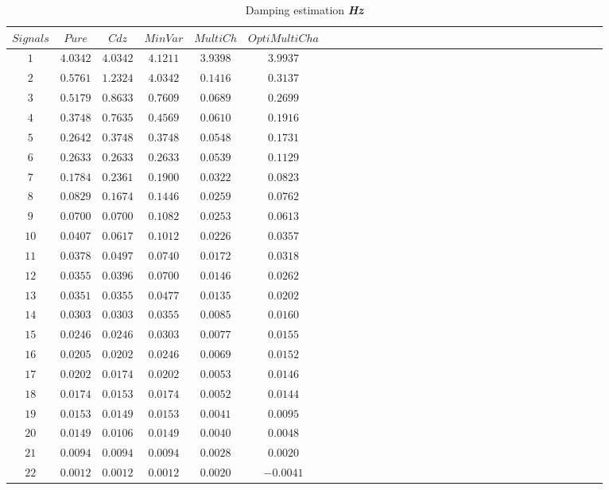  \begin{table}[!htbp]
\centering
\caption{Damping estimation \textbf{\textit{Hz}}}
\label{table:5}
\begin{tabular}{c c c c c c c c c c c c c c c c c c c c c c c c c c c c c c c } 
   \hline 
$Signals$&$Pure$&$Cdz$&$MinVar$&$MultiCh$&$OptiMultiCha$\\
   \hline 
$1$&$ 4.0342$&$ 4.0342$&$ 4.1211$&$ 3.9398$&$ 3.9937$\\
$2$&$ 0.5761$&$ 1.2324$&$ 4.0342$&$ 0.1416$&$ 0.3137$\\
$3$&$ 0.5179$&$ 0.8633$&$ 0.7609$&$ 0.0689$&$ 0.2699$\\
$4$&$ 0.3748$&$ 0.7635$&$ 0.4569$&$ 0.0610$&$ 0.1916$\\
$5$&$ 0.2642$&$ 0.3748$&$ 0.3748$&$ 0.0548$&$ 0.1731$\\
$6$&$ 0.2633$&$ 0.2633$&$ 0.2633$&$ 0.0539$&$ 0.1129$\\
$7$&$ 0.1784$&$ 0.2361$&$ 0.1900$&$ 0.0322$&$ 0.0823$\\
$8$&$ 0.0829$&$ 0.1674$&$ 0.1446$&$ 0.0259$&$ 0.0762$\\
$9$&$ 0.0700$&$ 0.0700$&$ 0.1082$&$ 0.0253$&$ 0.0613$\\
$10$&$ 0.0407$&$ 0.0617$&$ 0.1012$&$ 0.0226$&$ 0.0357$\\
$11$&$ 0.0378$&$ 0.0497$&$ 0.0740$&$ 0.0172$&$ 0.0318$\\
$12$&$ 0.0355$&$ 0.0396$&$ 0.0700$&$ 0.0146$&$ 0.0262$\\
$13$&$ 0.0351$&$ 0.0355$&$ 0.0477$&$ 0.0135$&$ 0.0202$\\
$14$&$ 0.0303$&$ 0.0303$&$ 0.0355$&$ 0.0085$&$ 0.0160$\\
$15$&$ 0.0246$&$ 0.0246$&$ 0.0303$&$ 0.0077$&$ 0.0155$\\
$16$&$ 0.0205$&$ 0.0202$&$ 0.0246$&$ 0.0069$&$ 0.0152$\\
$17$&$ 0.0202$&$ 0.0174$&$ 0.0202$&$ 0.0053$&$ 0.0146$\\
$18$&$ 0.0174$&$ 0.0153$&$ 0.0174$&$ 0.0052$&$ 0.0144$\\
$19$&$ 0.0153$&$ 0.0149$&$ 0.0153$&$ 0.0041$&$ 0.0095$\\
$20$&$ 0.0149$&$ 0.0106$&$ 0.0149$&$ 0.0040$&$ 0.0048$\\
$21$&$ 0.0094$&$ 0.0094$&$ 0.0094$&$ 0.0028$&$ 0.0020$\\
$22$&$ 0.0012$&$ 0.0012$&$ 0.0012$&$ 0.0020$&$-0.0041$\\
     \hline 

\end{tabular}
\end{table}

